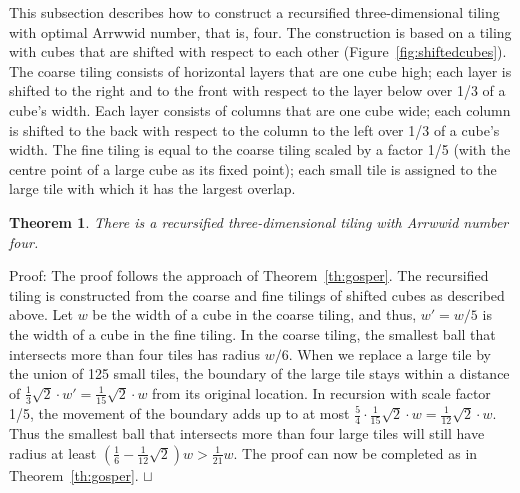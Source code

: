 \documentclass[11pt,a4paper]{article}
\newtheorem{theorem}{Theorem}
\newenvironment{proof}{Proof:}{\qed}
\def\squareforqed{\hbox{\rlap{$\sqcap$}$\sqcup$}}
\def\qed{\ifmmode\squareforqed\else{\unskip\nobreak\hfil
\penalty50\hskip1em\null\nobreak\hfil\squareforqed
\parfillskip=0pt\finalhyphendemerits=0\endgraf}\fi}
\begin{document}
\label{sec:3dshiftedcubes}
This subsection describes how to construct a recursified three-dimensional tiling with optimal Arrwwid number, that is, four. The construction is based on a tiling with cubes that are shifted with respect to each other (Figure~\ref{fig:shiftedcubes}). The coarse tiling consists of horizontal layers that are one cube high; each layer is shifted to the right and to the front with respect to the layer below over 1/3 of a cube's width. Each layer consists of columns that are one cube wide; each column is shifted to the back with respect to the column to the left over 1/3 of a cube's width. The fine tiling is equal to the coarse tiling scaled by a factor 1/5 (with the centre point of a large cube as its fixed point); each small tile is assigned to the large tile with which it has the largest overlap.

\begin{theorem}
There is a recursified three-dimensional tiling with Arrwwid number four.
\end{theorem}
\begin{proof}
The proof follows the approach of Theorem~\ref{th:gosper}. The recursified tiling is constructed from the coarse and fine tilings of shifted cubes as described above. Let $w$ be the width of a cube in the coarse tiling, and thus, $w' = w/5$ is the width of a cube in the fine tiling. In the coarse tiling, the smallest ball that intersects more than four tiles has radius $w/6$. When we replace a large tile by the union of 125 small tiles, the boundary of the large tile stays within a distance of $\frac13 \sqrt{2} \cdot w' = \frac{1}{15}\sqrt{2} \cdot w$ from its original location. In recursion with scale factor 1/5, the movement of the boundary adds up to at most $\frac54 \cdot \frac1{15}\sqrt{2} \cdot w = \frac{1}{12}\sqrt{2} \cdot w$. Thus the smallest ball that intersects more than four large tiles will still have radius at least $(\frac16 - \frac1{12}\sqrt{2})w > \frac{1}{21}w$. The proof can now be completed as in Theorem~\ref{th:gosper}.
\end{proof}
\end{document}
